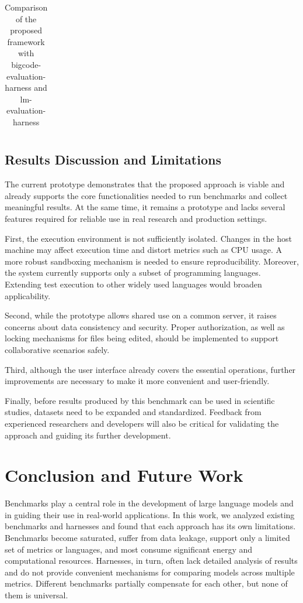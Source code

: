 \begin{landscape}
\begin{longtable}{|p{4cm}|p{5cm}|p{5cm}|p{5cm}|}
\caption{Comparison of the proposed framework with bigcode-evaluation-harness and lm-evaluation-harness}
\label{tab:framework-comparison-with-proposed}
\end{longtable}
\end{landscape}


\subsection{Results Discussion and Limitations}

The current prototype demonstrates that the proposed approach is viable and already supports the core functionalities needed to run benchmarks and collect meaningful results.
At the same time, it remains a prototype and lacks several features required for reliable use in real research and production settings.

First, the execution environment is not sufficiently isolated.
Changes in the host machine may affect execution time and distort metrics such as CPU usage.
A more robust sandboxing mechanism is needed to ensure reproducibility.
Moreover, the system currently supports only a subset of programming languages.
Extending test execution to other widely used languages would broaden applicability.

Second, while the prototype allows shared use on a common server, it raises concerns about data consistency and security.
Proper authorization, as well as locking mechanisms for files being edited, should be implemented to support collaborative scenarios safely.

Third, although the user interface already covers the essential operations, further improvements are necessary to make it more convenient and user-friendly.

Finally, before results produced by this benchmark can be used in scientific studies, datasets need to be expanded and standardized.
Feedback from experienced researchers and developers will also be critical for validating the approach and guiding its further development.

\section{Conclusion and Future Work}

Benchmarks play a central role in the development of large language models and in guiding their use in real-world applications.
In this work, we analyzed existing benchmarks and harnesses and found that each approach has its own limitations.
Benchmarks become saturated, suffer from data leakage, support only a limited set of metrics or languages, and most consume significant energy and computational resources.
Harnesses, in turn, often lack detailed analysis of results and do not provide convenient mechanisms for comparing models across multiple metrics.
Different benchmarks partially compensate for each other, but none of them is universal.

